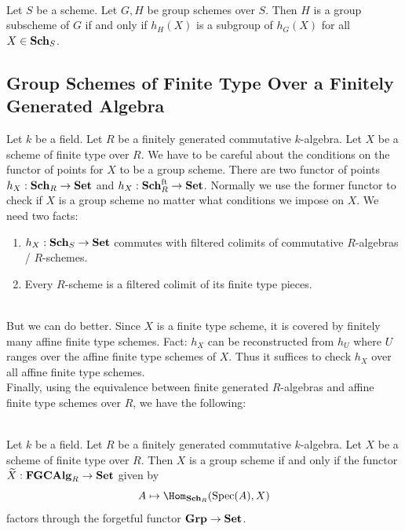 \documentclass[a4paper]{article}
\begin{document}
\begin{lmm}{}{}\\
Let $S$ be a scheme. Let $G,H$ be group schemes over $S$. Then $H$ is a group subscheme of $G$ if and only if $h_H(X)$ is a subgroup of $h_G(X)$ for all $X\in\bold{Sch}_S$. 
\end{lmm}

\subsection{Group Schemes of Finite Type Over a Finitely Generated Algebra}
Let $k$ be a field. Let $R$ be a finitely generated commutative $k$-algebra. Let $X$ be a scheme of finite type over $R$. We have to be careful about the conditions on the functor of points for $X$ to be a group scheme. There are two functor of points $h_X:\bold{Sch}_R\to\bold{Set}$ and $h_X:\bold{Sch}_R^\text{ft}\to\bold{Set}$. Normally we use the former functor to check if $X$ is a group scheme no matter what conditions we impose on $X$. We need two facts:
\begin{enumerate}
\item $h_X:\bold{Sch}_S\to\bold{Set}$ commutes with filtered colimits of commutative $R$-algebras / $R$-schemes. 
\item Every $R$-scheme is a filtered colimit of its finite type pieces. 
\end{enumerate}~\\

But we can do better. Since $X$ is a finite type scheme, it is covered by finitely many affine finite type schemes. Fact: $h_X$ can be reconstructed from $h_U$ where $U$ ranges over the affine finite type schemes of $X$. Thus it suffices to check $h_X$ over all affine finite type schemes. \\

Finally, using the equivalence between finite generated $R$-algebras and affine finite type schemes over $R$, we have the following: 

\begin{prp}{}{}\\
Let $k$ be a field. Let $R$ be a finitely generated commutative $k$-algebra. Let $X$ be a scheme of finite type over $R$. Then $X$ is a group scheme if and only if the functor $\widetilde{X}:\bold{FGCAlg}_R\to\bold{Set}$ given by $$A\mapsto\Hom_{\bold{Sch}_R}(\text{Spec}(A),X)$$ factors through the forgetful functor $\bold{Grp}\to\bold{Set}$. 
\end{prp}
\end{document}
